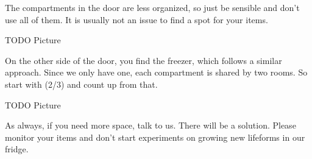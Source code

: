 The compartments in the door are less organized, so just be sensible and don't use all of them. It is usually not an issue to find a spot for your items.

{\color{darkred} TODO Picture}

On the other side of the door, you find the freezer, which follows a similar approach. Since we only have one, each compartment is shared by two rooms. So start with (2/3) and count up from that.

{\color{darkred} TODO Picture}

As always, if you need more space, talk to us. There will be a solution. Please monitor your items and don't start experiments on growing new lifeforms in our fridge.